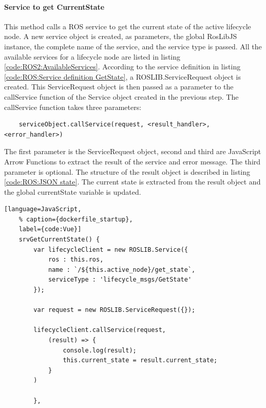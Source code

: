 \paragraph{Service to get CurrentState} This method calls a ROS service to get the current state of the active lifecycle node. A new service object is created, as parameters, the global RosLibJS instance, the complete name of the service, and the service type is passed. All the available services for a lifecycle node are listed in listing \ref{code:ROS2:AvailableServices}. According to the service definition in listing \ref{code:ROS:Service definition GetState}, a ROSLIB.ServiceRequest object is created. This ServiceRequest object is then passed as a parameter to the callService function of the Service object created in the previous step.
The callService function takes three parameters:
\begin{lstlisting}
    serviceObject.callService(request, <result_handler>, <error_handler>)
\end{lstlisting}
The first parameter is the ServiceRequest object, second and third are JavaScript Arrow Functions to extract the result of the service and error message. The third parameter is optional. The structure of the result object is described in listing \ref{code:ROS:JSON state}. The current state is extracted from the result object and the global currentState variable is updated.
\begin{lstlisting}[language=JavaScript,
	% caption={dockerfile_startup}, 
	label={code:Vue}]
	srvGetCurrentState() {
		var lifecycleClient = new ROSLIB.Service({
			ros : this.ros,
			name : `/${this.active_node}/get_state`,
			serviceType : 'lifecycle_msgs/GetState'
		});

		var request = new ROSLIB.ServiceRequest({});

		lifecycleClient.callService(request, 
			(result) => {
				console.log(result);
				this.current_state = result.current_state;
			}
		)
		
		},
\end{lstlisting}

